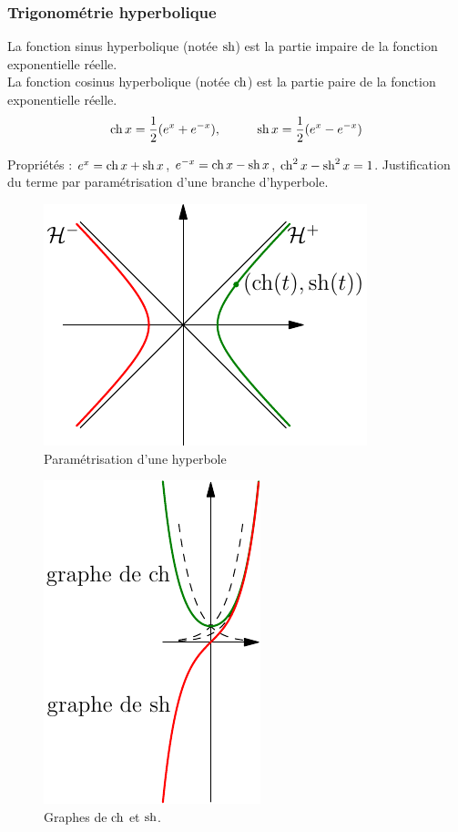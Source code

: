 \subsubsection{Trigonométrie hyperbolique}
\begin{defi}
 La fonction sinus hyperbolique (notée $\mathop{\mathrm{sh}}$) est la partie impaire de la fonction exponentielle réelle.\\
La fonction cosinus hyperbolique (notée $\mathop{\mathrm{ch}}$) est la partie paire de la fonction exponentielle réelle.
\begin{displaymath}
  \mathop{\mathrm{ch}} x = \frac{1}{2}(e^{x} + e^{-x}),\hspace{1cm} \mathop{\mathrm{sh}} x = \frac{1}{2}(e^{x} - e^{-x})
\end{displaymath}
\end{defi}
Propriétés : $e^{x} =  \mathop{\mathrm{ch}} x + \mathop{\mathrm{sh}} x$, $e^{-x} = \mathop{\mathrm{ch}} x - \mathop{\mathrm{sh}} x$, $\mathop{\mathrm{ch}}^2x - \mathop{\mathrm{sh}}^2 x = 1$. 
Justification du terme par paramétrisation d'une branche d'hyperbole.
\begin{figure}[h]
  \centering
  \includegraphics{./C2004_4.pdf}
  \caption{Paramétrisation d'une hyperbole}
  \label{fig:C2004_4}
\end{figure}
\begin{figure}[h]
  \centering
  \includegraphics{./C2004_5.pdf}
  \caption{Graphes de $\mathop{\mathrm{ch}}$ et $\mathop{\mathrm{sh}}$.}
  \label{fig:C2004_5}
\end{figure}

